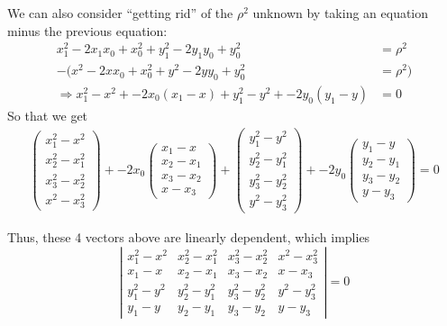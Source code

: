 \documentclass[twoside]{amsart}
\theoremstyle{plain}
\theoremstyle{definition}
\begin{document}
\begin{enumerate}
We can also consider ``getting rid'' of the $\rho^2$ unknown by taking an equation minus the previous equation:
\[
\begin{aligned}
  x_1^2 - 2x_1 x_0 + x_0^2 + y_1^2 -2y_1 y_0 + y_0^2 & = \rho^2 \\ 
  - (x^2 - 2x x_0 + x_0^2 + y^2 - 2y y_0 + y_0^2 & = \rho^2 ) \\
  \Longrightarrow x_1^2 - x^2 + -2x_0(x_1-x) + y_1^2 - y^2 + -2y_0(y_1-y) & = 0
\end{aligned}
\]
So that we get
\[
\begin{aligned}
\left( \begin{matrix} x_1^2 - x^2 \\ x_2^2 - x_1^2 \\ x_3^2 - x_2^2 \\ x^2 - x_3^2 \end{matrix} \right) + -2x_0 \left( \begin{matrix} x_1 - x \\ x_2 - x_1 \\ x_3 - x_2 \\ x - x_3 \end{matrix} \right) + \left( \begin{matrix} y_1^2 - y^2 \\ y_2^2 - y_1^2 \\ y_3^2 - y_2^2 \\ y^2 - y_3^2 \end{matrix} \right) + -2y_0 \left( \begin{matrix} y_1 - y \\ y_2 - y_1 \\ y_3 - y_2 \\ y - y_3 \end{matrix} \right) = 0 
\end{aligned}
\]
\end{enumerate}
Thus, these 4 vectors above are linearly dependent, which implies
\[
\boxed{ \left| \begin{matrix}  x_1^2 - x^2 & x_2^2 - x_1^2 & x_3^2 - x_2^2 & x^2 - x_3^2 \\ x_1 - x & x_2 - x_1 & x_3 - x_2 & x - x_3 \\ y_1^2 - y^2 & y_2^2 - y_1^2 & y_3^2 - y_2^2 & y^2 - y_3^2 \\ y_1 -y & y_2 - y_1 & y_3 - y_2 & y - y_3  \end{matrix} \right| = 0 }
\]
\end{document}
